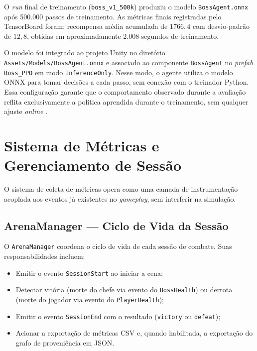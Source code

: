 O \textit{run} final de treinamento (\texttt{boss\_v1\_500k}) produziu o
modelo \texttt{BossAgent.onnx} após 500.000 passos de treinamento. As
métricas finais registradas pelo TensorBoard foram: recompensa média
acumulada de $1766{,}4$ com desvio-padrão de $12{,}8$, obtidas em
aproximadamente 2.008 segundos de treinamento.

O modelo foi integrado ao projeto Unity no diretório
\texttt{Assets/Models/BossAgent.onnx} e associado ao componente
\texttt{BossAgent} no \textit{prefab} \texttt{Boss\_PPO} em modo
\texttt{InferenceOnly}. Nesse modo, o agente utiliza o modelo ONNX para
tomar decisões a cada passo, sem conexão com o treinador Python. Essa
configuração garante que o comportamento observado durante a avaliação reflita
exclusivamente a política aprendida durante o treinamento, sem qualquer ajuste
\textit{online} \cite{onnx2019}.

\section{Sistema de Métricas e Gerenciamento de Sessão}
\label{sec:sistema-metricas}

O sistema de coleta de métricas opera como uma camada de instrumentação
acoplada aos eventos já existentes no \textit{gameplay}, sem interferir na
simulação.

\subsection{ArenaManager --- Ciclo de Vida da Sessão}
\label{subsec:arena-manager}

O \texttt{ArenaManager} coordena o ciclo de vida de cada sessão de combate.
Suas responsabilidades incluem:

\begin{itemize}
    \item Emitir o evento \texttt{SessionStart} ao iniciar a cena;
    \item Detectar vitória (morte do chefe via evento do \texttt{BossHealth})
          ou derrota (morte do jogador via evento do \texttt{PlayerHealth});
    \item Emitir o evento \texttt{SessionEnd} com o resultado
          (\texttt{victory} ou \texttt{defeat});
    \item Acionar a exportação de métricas CSV e, quando habilitada, a
          exportação do grafo de proveniência em JSON.
\end{itemize}

